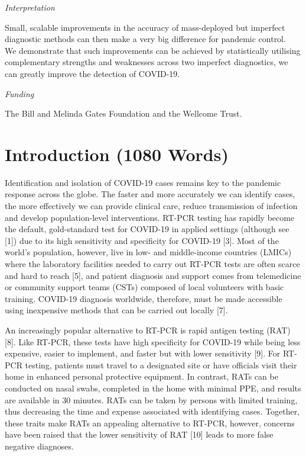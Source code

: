 \documentclass[]{elsarticle} %
\begin{document}
\emph{Interpretation}

Small, scalable improvements in the accuracy of mass-deployed but imperfect diagnostic methods can then make a very big difference for pandemic control.\\
We demonstrate that such improvements can be achieved by statistically utilising complementary strengths and weaknesses across two imperfect diagnostics, we can greatly improve the detection of COVID-19.

\emph{Funding}

The Bill and Melinda Gates Foundation and the Wellcome Trust.

\hypertarget{introduction-1080-words}{%
\section{Introduction (1080 Words)}\label{introduction-1080-words}}

Identification and isolation of COVID-19 cases remains key to the pandemic response across the globe.
The faster and more accurately we can identify cases, the more effectively we can provide clinical care, reduce transmission of infection and develop population-level interventions.
RT-PCR testing has rapidly become the default, gold-standard test for COVID-19 in applied settings (although see {[}1{]}) due to its high sensitivity and specificity for COVID-19 {[}3{]}.
Most of the world's population, however, live in low- and middle-income countries (LMICs) where the laboratory facilities needed to carry out RT-PCR tests are often scarce and hard to reach {[}5{]}, and patient diagnosis and support comes from telemedicine or community support teams (CSTs) composed of local volunteers with basic training.
COVID-19 diagnosis worldwide, therefore, must be made accessible using inexpensive methods that can be carried out locally {[}7{]}.

An increasingly popular alternative to RT-PCR is rapid antigen testing (RAT) {[}8{]}.
Like RT-PCR, these tests have high specificity for COVID-19 while being less expensive, easier to implement, and faster but with lower sensitivity {[}9{]}.
For RT-PCR testing, patients must travel to a designated site or have officials visit their home in enhanced personal protective equipment.
In contrast, RATs can be conducted on nasal swabs, completed in the home with minimal PPE, and results are available in 30 minutes.
RATs can be taken by persons with limited training, thus decreasing the time and expense associated with identifying cases.
Together, these traits make RATs an appealing alternative to RT-PCR, however, concerns have been raised that the lower sensitivity of RAT {[}10{]} leads to more false negative diagnoses.
\end{document}
